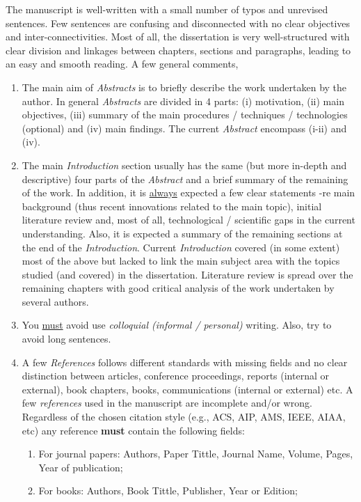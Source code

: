 \documentclass[14pt,twoside]{report}
\begin{document}
\begin{description}
The manuscript is well-written with a small number of typos and unrevised sentences. Few sentences are confusing and disconnected with no clear objectives and inter-connectivities. Most of all, the dissertation is very well-structured with clear division and linkages between chapters, sections and paragraphs, leading to an easy and smooth reading. A few general comments,
\begin{enumerate}
%
\item The main aim of {\it Abstracts} is to briefly describe the work undertaken by the author. In general {\it Abstracts} are divided in 4 parts: (i) motivation, (ii) main objectives, (iii) summary of the main procedures / techniques / technologies (optional) and (iv) main findings. The current {\it Abstract} encompass (i-ii) and (iv). 
%
\item The main {\it Introduction} section usually has the same (but more in-depth and descriptive) four parts of the {\it Abstract} and a brief summary of the remaining of the work. In addition, it is \underline{always} expected a few clear statements -re main background (thus recent innovations related to the main topic), initial literature review and, most of all, technological / scientific gaps in the current understanding. Also, it is expected a summary of the remaining sections at the end of the {\it Introduction}.  Current {\it Introduction} covered (in some extent) most of the above but lacked to link the main subject area with the topics studied (and covered) in the dissertation. Literature review is spread over the remaining chapters with good critical analysis of the work undertaken by several authors. 
%
\item You \underline{must} avoid use {\it colloquial (informal / personal)} writing. Also, try to avoid long sentences. 
%
\item A few {\it References} follows different standards with missing fields and no clear distinction between articles, conference proceedings, reports (internal or external), book chapters, books, communications (internal or external) etc.  A few {\it references} used in the manuscript are incomplete and/or wrong. Regardless of the chosen citation style (e.g., ACS, AIP, AMS, IEEE, AIAA, etc) any reference {\bf must} contain the following fields: 
\begin{enumerate}
\item For journal papers: Authors, Paper Tittle, Journal Name, Volume, Pages, Year of publication;
\item For books: Authors, Book Tittle, Publisher, Year or Edition;

\end{enumerate}
\end{enumerate}
\end{description}
\end{document}
